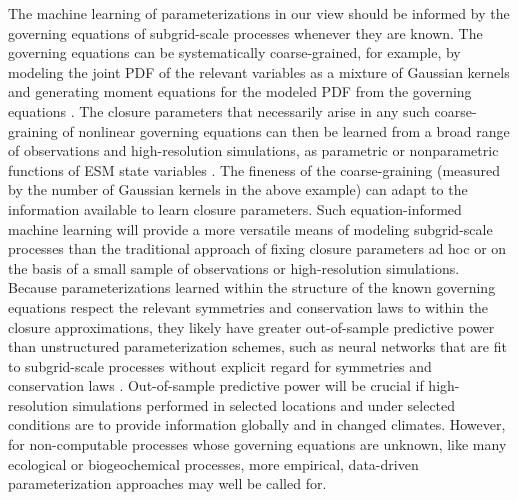 \documentclass[draft]{agujournal}
\begin{document}
The machine learning of parameterizations in our view should be informed by the governing equations of subgrid-scale processes whenever they are known. The governing equations can be systematically coarse-grained, for example, by modeling the joint PDF of the relevant variables as a mixture of Gaussian kernels and generating moment equations for the modeled PDF from the governing equations \citep[cf.][]{Lappen01a,Golaz02a,Guo15a,Firl15a}. The closure parameters that necessarily arise in any such coarse-graining of nonlinear governing equations can then be learned from a broad range of observations and high-resolution simulations, as parametric or nonparametric functions of ESM state variables \citep[cf.][]{Parish16a}. The fineness of the coarse-graining (measured by the number of Gaussian kernels in the above example) can adapt to the information available to learn closure parameters. Such equation-informed machine learning will provide a more versatile means of modeling subgrid-scale processes than the traditional approach of fixing closure parameters ad hoc or on the basis of a small sample of observations or high-resolution simulations. Because parameterizations learned within the structure of the known governing equations respect the relevant symmetries and conservation laws to within the closure approximations, they likely have greater out-of-sample predictive power than unstructured parameterization schemes, such as neural networks that are fit to subgrid-scale processes without explicit regard for symmetries  and conservation laws \citep[e.g.,][]{Krasnopolsky13a}. Out-of-sample predictive power will be crucial if high-resolution simulations performed in selected locations and under selected conditions are to provide information globally and in changed climates. However, for non-computable processes whose governing equations are unknown, like many ecological or biogeochemical processes, more empirical, data-driven parameterization approaches may well be called for. 
\end{document}

